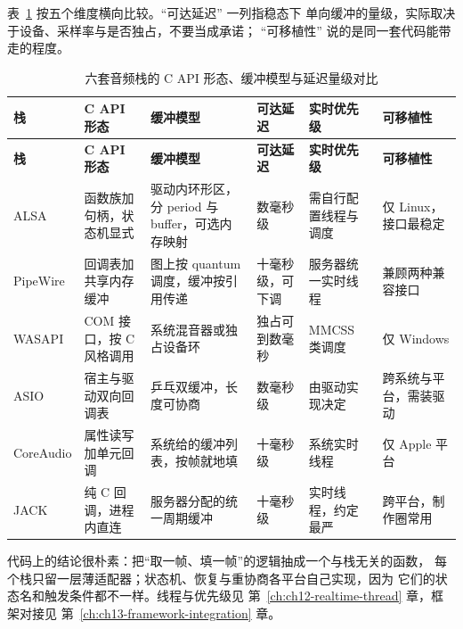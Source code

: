\documentclass[12pt,a4paper,fontset=fandol]{ctexbook}
\newcommand{\Lang}[1]{\textsf{#1}}
\newcommand{\CL}{\Lang{C}}
\begin{document}
表~\ref{tab:ch03-stacks} 按五个维度横向比较。``可达延迟'' 一列指稳态下
单向缓冲的量级，实际取决于设备、采样率与是否独占，不要当成承诺；
``可移植性'' 说的是同一套代码能带走的程度。

\begin{longtable}{>{\raggedright\arraybackslash}p{}
                  >{\raggedright\arraybackslash}p{}
                  >{\raggedright\arraybackslash}p{}
                  >{\raggedright\arraybackslash}p{}
                  >{\raggedright\arraybackslash}p{}
                  >{\raggedright\arraybackslash}p{}}
\caption{六套音频栈的 C API 形态、缓冲模型与延迟量级对比}\label{tab:ch03-stacks} \\
\toprule
\textbf{栈} & \textbf{C API 形态} & \textbf{缓冲模型} & \textbf{可达延迟} & \textbf{实时优先级} & \textbf{可移植性} \\
\midrule
\endfirsthead
\toprule
\textbf{栈} & \textbf{C API 形态} & \textbf{缓冲模型} & \textbf{可达延迟} & \textbf{实时优先级} & \textbf{可移植性} \\
\midrule
\endhead
\midrule
\bottomrule
\endlastfoot
ALSA & 函数族加句柄，状态机显式 & 驱动内环形区，分 period 与 buffer，可选内存映射 & 数毫秒级 & 需自行配置线程与调度 & 仅 Linux，接口最稳定 \\
PipeWire & 回调表加共享内存缓冲 & 图上按 quantum 调度，缓冲按引用传递 & 十毫秒级，可下调 & 服务器统一实时线程 & 兼顾两种兼容接口 \\
WASAPI & COM 接口，按 \CL{} 风格调用 & 系统混音器或独占设备环 & 独占可到数毫秒 & MMCSS 类调度 & 仅 Windows \\
ASIO & 宿主与驱动双向回调表 & 乒乓双缓冲，长度可协商 & 数毫秒级 & 由驱动实现决定 & 跨系统与平台，需装驱动 \\
CoreAudio & 属性读写加单元回调 & 系统给的缓冲列表，按帧就地填 & 十毫秒级 & 系统实时线程 & 仅 Apple 平台 \\
JACK & 纯 \CL{} 回调，进程内直连 & 服务器分配的统一周期缓冲 & 十毫秒级 & 实时线程，约定最严 & 跨平台，制作圈常用 \\
\end{longtable}

代码上的结论很朴素：把``取一帧、填一帧''的逻辑抽成一个与栈无关的函数，
每个栈只留一层薄适配器；状态机、恢复与重协商各平台自己实现，因为
它们的状态名和触发条件都不一样。线程与优先级见
第~\ref{ch:ch12-realtime-thread} 章，框架对接见
第~\ref{ch:ch13-framework-integration} 章。
\end{document}
